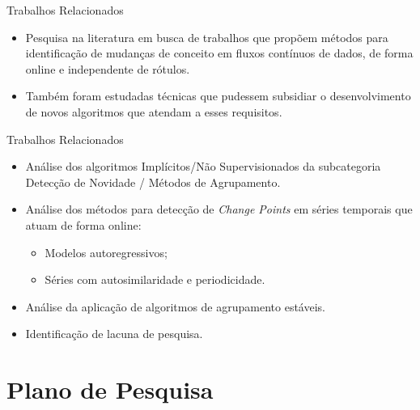 \documentclass[10pt]{beamer}
\begin{document}

\begin{frame}{Trabalhos Relacionados}
    \begin{itemize}
        \item<1 -> Pesquisa na literatura em busca de trabalhos que propõem métodos para identificação de mudanças de conceito em fluxos contínuos de dados, de forma online e independente de rótulos. 
        \item<2 -> Também foram estudadas técnicas que pudessem subsidiar o desenvolvimento de novos algoritmos que atendam a esses requisitos.
    \end{itemize}
\end{frame}

\begin{frame}{Trabalhos Relacionados}
    \begin{itemize}
        \item<1 -> Análise dos algoritmos \alert{Implícitos/Não Supervisionados} da subcategoria \alert{Detecção de Novidade / Métodos de Agrupamento}.
        \item<2 -> Análise dos métodos para detecção de \textit{Change Points} em séries temporais que atuam de forma online:
        \begin{itemize}
            \item<2 -> Modelos autoregressivos;
            \item<2 -> Séries com autosimilaridade e periodicidade.
        \end{itemize}
        \item<3 -> Análise da aplicação de algoritmos de agrupamento estáveis.
        \item<4 -> Identificação de lacuna de pesquisa.
      \end{itemize}
\end{frame}

\section{Plano de Pesquisa}

\end{document}

